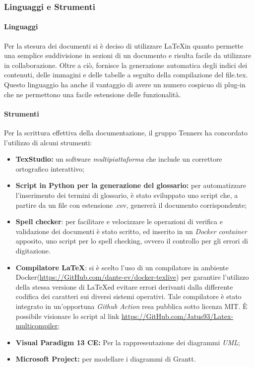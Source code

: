 \subsubsection{Linguaggi e Strumenti}
\paragraph{Linguaggi}
Per la stesura dei documenti si è deciso di utilizzare \LaTeX \space in quanto permette una semplice suddivisione in sezioni di un documento e risulta facile da utilizzare in collaborazione. Oltre a ciò, fornisce la generazione automatica degli indici dei contenuti, delle immagini e delle tabelle a seguito della compilazione del file.tex. Questo linguaggio ha anche il vantaggio di avere un numero cospicuo di plug-in che ne permettono una facile estensione delle funzionalità.

\paragraph{Strumenti}
Per la scrittura effettiva della documentazione, il gruppo Tenners ha concordato l'utilizzo di alcuni strumenti:
\begin{itemize}
	\item \textbf{TexStudio:} un software \textit{multipiattaforma\glo} che include un correttore ortografico interattivo;
	\item \textbf{Script in Python per la generazione del glossario:} per automatizzare l'inserimento dei termini di glossario, è stato sviluppato uno script che, a partire da un file con estensione .csv, genererà il documento corrispondente;
	\item \textbf{Spell checker}: per facilitare e velocizzare le operazioni di verifica e validazione dei documenti è
	stato scritto, ed inserito in un \textit{Docker container\glo} apposito, uno script per lo
	spell checking, ovvero il controllo per gli errori di digitazione.
	\item \textbf{Compilatore \LaTeX}: si è scelto l'uso di un compilatore in ambiente Docker\glo (\url{https://GitHub.com/dante-ev/docker-texlive}) per garantire l'utilizzo della stessa versione di \LaTeX ed evitare errori derivanti dalla differente codifica dei caratteri sui diversi sistemi operativi. Tale compilatore è stato integrato in un'opportuna \textit{Github Action\glo} resa pubblica sotto licenza MIT. È possibile visionare lo script al link \url{https://GitHub.com/Jatus93/Latex-multicompiler};
	\item \textbf{Visual Paradigm 13 CE:} Per la rappresentazione dei diagrammi \textit{UML\glo};
	\item \textbf{Microsoft Project:} per modellare i diagrammi di Grantt.
\end{itemize} 

